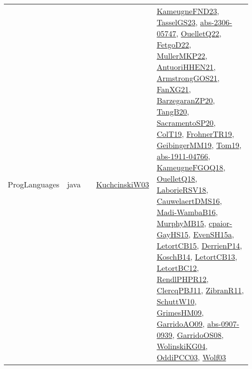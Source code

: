 {\begin{longtable}{lp{3cm}>{\raggedright}p{6cm}>{\raggedright}p{6cm}p{8cm}}
ProgLanguages & java  &  & \href{articles/KuchcinskiW03.pdf}{KuchcinskiW03}\cite{KuchcinskiW03} & \href{papers/KameugneFND23.pdf}{KameugneFND23}\cite{KameugneFND23}, \href{papers/TasselGS23.pdf}{TasselGS23}\cite{TasselGS23}, \href{articles/abs-2306-05747.pdf}{abs-2306-05747}\cite{abs-2306-05747}, \href{papers/OuelletQ22.pdf}{OuelletQ22}\cite{OuelletQ22}, \href{articles/FetgoD22.pdf}{FetgoD22}\cite{FetgoD22}, \href{articles/MullerMKP22.pdf}{MullerMKP22}\cite{MullerMKP22}, \href{papers/AntuoriHHEN21.pdf}{AntuoriHHEN21}\cite{AntuoriHHEN21}, \href{papers/ArmstrongGOS21.pdf}{ArmstrongGOS21}\cite{ArmstrongGOS21}, \href{articles/FanXG21.pdf}{FanXG21}\cite{FanXG21}, \href{papers/BarzegaranZP20.pdf}{BarzegaranZP20}\cite{BarzegaranZP20}, \href{papers/TangB20.pdf}{TangB20}\cite{TangB20}, \href{articles/SacramentoSP20.pdf}{SacramentoSP20}\cite{SacramentoSP20}, \href{papers/ColT19.pdf}{ColT19}\cite{ColT19}, \href{papers/FrohnerTR19.pdf}{FrohnerTR19}\cite{FrohnerTR19}, \href{papers/GeibingerMM19.pdf}{GeibingerMM19}\cite{GeibingerMM19}, \href{papers/Tom19.pdf}{Tom19}\cite{Tom19}, \href{articles/abs-1911-04766.pdf}{abs-1911-04766}\cite{abs-1911-04766}, \href{papers/KameugneFGOQ18.pdf}{KameugneFGOQ18}\cite{KameugneFGOQ18}, \href{papers/OuelletQ18.pdf}{OuelletQ18}\cite{OuelletQ18}, \href{articles/LaborieRSV18.pdf}{LaborieRSV18}\cite{LaborieRSV18}, \href{papers/CauwelaertDMS16.pdf}{CauwelaertDMS16}\cite{CauwelaertDMS16}, \href{papers/Madi-WambaB16.pdf}{Madi-WambaB16}\cite{Madi-WambaB16}, \href{papers/MurphyMB15.pdf}{MurphyMB15}\cite{MurphyMB15}, \href{papers/cpaior-GayHS15.pdf}{cpaior-GayHS15}\cite{cpaior-GayHS15}, \href{articles/EvenSH15a.pdf}{EvenSH15a}\cite{EvenSH15a}, \href{articles/LetortCB15.pdf}{LetortCB15}\cite{LetortCB15}, \href{papers/DerrienP14.pdf}{DerrienP14}\cite{DerrienP14}, \href{papers/KoschB14.pdf}{KoschB14}\cite{KoschB14}, \href{papers/LetortCB13.pdf}{LetortCB13}\cite{LetortCB13}, \href{papers/LetortBC12.pdf}{LetortBC12}\cite{LetortBC12}, \href{papers/RendlPHPR12.pdf}{RendlPHPR12}\cite{RendlPHPR12}, \href{papers/ClercqPBJ11.pdf}{ClercqPBJ11}\cite{ClercqPBJ11}, \href{papers/ZibranR11.pdf}{ZibranR11}\cite{ZibranR11}, \href{papers/SchuttW10.pdf}{SchuttW10}\cite{SchuttW10}, \href{papers/GrimesHM09.pdf}{GrimesHM09}\cite{GrimesHM09}, \href{articles/GarridoAO09.pdf}{GarridoAO09}\cite{GarridoAO09}, \href{articles/abs-0907-0939.pdf}{abs-0907-0939}\cite{abs-0907-0939}, \href{articles/GarridoOS08.pdf}{GarridoOS08}\cite{GarridoOS08}, \href{papers/WolinskiKG04.pdf}{WolinskiKG04}\cite{WolinskiKG04}, \href{papers/OddiPCC03.pdf}{OddiPCC03}\cite{OddiPCC03}, \href{papers/Wolf03.pdf}{Wolf03}\cite{Wolf03}\\

\end{longtable}}
